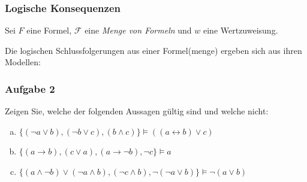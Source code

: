 \documentclass{beamer}
\begin{document}
	\begin{frame}\frametitle{Logische Konsequenzen}
		\footnotesize
		Sei $F$ eine Formel, $\mathcal{F}$ eine \textit{Menge von Formeln} und $w$ eine Wertzuweisung.
		
		\pause
		
		Die logischen Schlussfolgerungen aus einer Formel(menge) ergeben sich aus ihren Modellen:
		
	\end{frame}

	\begin{frame} \frametitle{Aufgabe 2}
		\small
		Zeigen Sie, welche der folgenden Aussagen gültig sind und welche nicht:
		\begin{enumerate}[(a)]
			\item $\{ (\neg a \lor b), (\neg b \lor c), (b \land c) \}
			\models ((a \leftrightarrow b) \lor c)$
			\item $\{ (a \rightarrow b), (c \lor a), (a \rightarrow \neg b),
			\neg c \} \models a$
			\item $\{ (a \land \neg b) \lor (\neg a \land b), (\neg c
			\land b), \neg (\neg a \lor b) \} \models \neg(a \lor b)$
		\end{enumerate}
	\end{frame}
\end{document}
